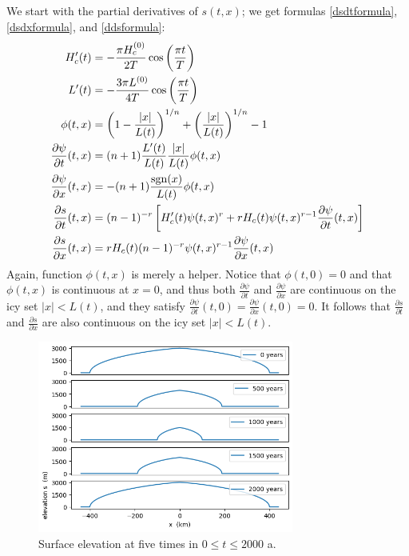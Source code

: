 \documentclass[letterpaper,final,12pt,reqno]{amsart}
\newcommand{\sgn}{\operatorname{sgn}}
\begin{document}
We start with the partial derivatives of $s(t,x)$; we get formulas \eqref{dsdtformula}, \eqref{dsdxformula}, and \eqref{ddsformula}:
\begin{align}
H_c'(t) &= - \frac{\pi H_c^{(0)}}{2T} \cos\left(\frac{\pi t}{T}\right) \notag\\
L'(t) &= - \frac{3 \pi L^{(0)}}{4T} \cos\left(\frac{\pi t}{T}\right) \notag \\
\phi(t,x) &= \left(1 - \frac{|x|}{L(t)}\right)^{1/n} + \left(\frac{|x|}{L(t)}\right)^{1/n} - 1 \notag \\
\frac{\partial \psi}{\partial t}(t,x) &= (n+1) \frac{L'(t)}{L(t)} \frac{|x|}{L(t)} \phi(t,x) \notag \\
\frac{\partial \psi}{\partial x}(t,x) &= - (n+1) \frac{\sgn(x)}{L(t)} \phi(t,x) \notag \\
\frac{\partial s}{\partial t}(t,x) &= (n-1)^{-r} \left[H_c'(t) \psi(t,x)^r + r H_c(t) \psi(t,x)^{r-1} \frac{\partial \psi}{\partial t}(t,x)\right] \label{dsdtformula} \\
\frac{\partial s}{\partial x}(t,x) &= r H_c(t) (n-1)^{-r} \psi(t,x)^{r-1} \frac{\partial \psi}{\partial x}(t,x) \label{dsdxformula}
\end{align}
Again, function $\phi(t,x)$ is merely a helper.  Notice that $\phi(t,0)=0$ and that $\phi(t,x)$ is continuous at $x=0$, and thus both $\frac{\partial \psi}{\partial t}$ and $\frac{\partial \psi}{\partial x}$ are continuous on the icy set $|x|<L(t)$, and they satisfy $\frac{\partial \psi}{\partial t}(t,0)=\frac{\partial \psi}{\partial x}(t,0)=0$.  It follows that $\frac{\partial s}{\partial t}$ and $\frac{\partial s}{\partial x}$ are also continuous on the icy set $|x|<L(t)$.

\begin{figure}[t]
\includegraphics[width=0.75\textwidth]{surfacesnaps}
\caption{Surface elevation at five times in $0\le t \le 2000$ a.}
\label{surfacesnaps}
\end{figure}
\end{document}
